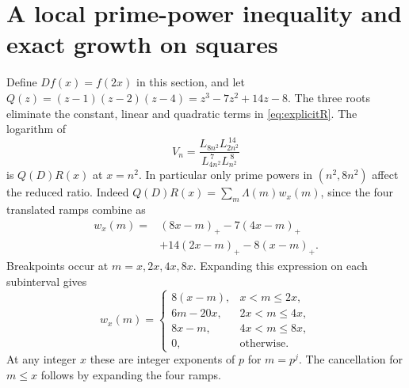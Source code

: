 \documentclass[11pt,a4paper]{article}
\begin{document}
\section{A local prime-power inequality and exact growth on squares}\label{sec:local}
Define $D f(x)=f(2x)$ in this section, and let $Q(z)=(z-1)(z-2)(z-4)=z^3-7z^2+14z-8$. The three roots eliminate the constant, linear and quadratic terms in \eqref{eq:explicitR}. The logarithm of
\begin{equation}\label{eq:ratio}
 V_n=\frac{L_{8n^2} L_{2n^2}^{\,14}}{L_{4n^2}^{\,7}L_{n^2}^{\,8}}
\end{equation}
is $Q(D)R(x)$ at $x=n^2$. In particular only prime powers in $(n^2,8n^2)$ affect the reduced ratio. Indeed $Q(D)R(x)=\sum_m\Lambda(m)w_x(m)$, since the four translated ramps combine as
\[
\begin{aligned}
 w_x(m)={}&(8x-m)_+-7(4x-m)_+\\
 &+14(2x-m)_+-8(x-m)_+.
\end{aligned}
\]
Breakpoints occur at $m=x,2x,4x,8x$. Expanding this expression on each subinterval gives
\begin{equation}\label{eq:weights}
 w_x(m)=
 \begin{cases}
  8(x-m),&x<m\le2x,\\
  6m-20x,&2x<m\le4x,\\
  8x-m,&4x<m\le8x,\\
  0,&\text{otherwise}.
 \end{cases}
\end{equation}
At any integer $x$ these are integer exponents of $p$ for $m=p^j$. The cancellation for $m\le x$ follows by expanding the four ramps.
\end{document}
